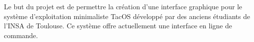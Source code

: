 Le but du projet est de permettre la création d'une interface graphique pour le système d'exploitation minimaliste TacOS développé par des anciens étudiants de l'INSA de Toulouse. Ce système offre actuellement une interface en ligne de commande.